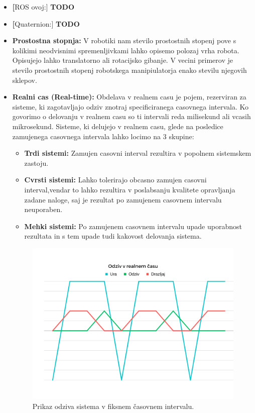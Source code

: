 \documentclass[a4paper,twoside,openright,12pt,slovene]{book}
\begin{document}
\begin{itemize}
    \item \textbf[ROS ovoj:] \label{ROS_wrapper} \textbf{TODO}

    \item \textbf[Quaternion:] \label{quaternion} \textbf{TODO}


    \item \textbf{Prostostna stopnja:} \label{DOF}V robotiki nam stevilo prostostnih stopenj pove s kolikimi neodvisnimi spremenljivkami lahko opisemo polozaj vrha robota. Opisujejo lahko translatorno ali rotacijsko gibanje. V vecini primerov je stevilo prostostnih stopenj robotskega manipiulatorja enako stevilu njegovih sklepov. \cite{DOF_website}

    \item \textbf{Realni cas (Real-time):}\label{RealTime} Obdelava v realnem casu je pojem, rezerviran za sisteme, ki zagotavljajo odziv znotraj specificiranega casovnega intervala. Ko govorimo o delovanju v realnem casu so ti intervali reda milisekund ali vcasih mikrosekund. Sisteme, ki delujejo v realnem casu, glede na posledice zamujenega casovnega intervala lahko locimo na 3 skupine:
    \begin{itemize}
        \item \textbf{Trdi sistemi:} Zamujen casovni interval rezultira v popolnem sistemskem zastoju.
        \item \textbf{Cvrsti sistemi:} Lahko tolerirajo obcasno zamujen casovni interval,vendar to lahko rezultira v poslabsanju kvalitete opravljanja zadane naloge, saj je rezultat po zamujenem casovnem intervalu neuporaben.
        \item \textbf{Mehki sistemi:} Po zamujenem casovnem intervalu upade uporabnost rezultata in s tem upade tudi kakovost delovanja sistema.
    \end{itemize}

\begin{figure}[h]
    \centering
    \includegraphics[width=0.75\columnwidth]{Slike/Untitled design (1).png}
    \caption{\label{RealTime} Prikaz odziva sistema v fiksnem časovnem intervalu.}
\end{figure}



    
\end{itemize}


\cleardoublepage{} %



\end{document}
